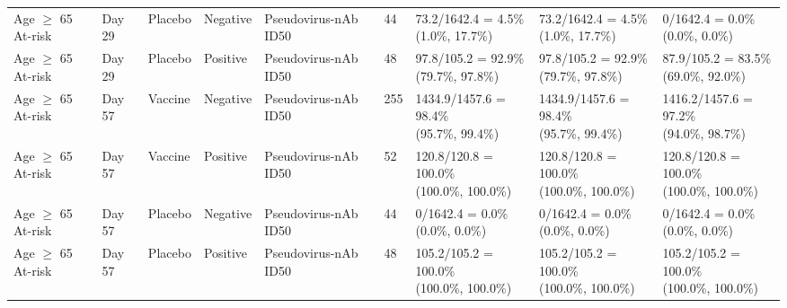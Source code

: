 \documentclass[]{book}
\theoremstyle{definition}
\theoremstyle{definition}
\theoremstyle{definition}
\newcommand{\1}{\mathbbm{1}}
\begin{document}
\begin{landscape}
\begin{ThreePartTable}
\begin{longtable}[t]{>{\raggedright\arraybackslash}p{2.7cm}llllllll}
\hspace{1em}Age $\geq$ 65 At-risk & Day 29 & Placebo & Negative & Pseudovirus-nAb ID50 & 44 & \makecell[l]{73.2/1642.4 = 4.5\%\\(1.0\%, 17.7\%)} & \makecell[l]{73.2/1642.4 = 4.5\%\\(1.0\%, 17.7\%)} & \makecell[l]{0/1642.4 = 0.0\%\\(0.0\%, 0.0\%)}\\
\hspace{1em}Age $\geq$ 65 At-risk & Day 29 & Placebo & Positive & Pseudovirus-nAb ID50 & 48 & \makecell[l]{97.8/105.2 = 92.9\%\\(79.7\%, 97.8\%)} & \makecell[l]{97.8/105.2 = 92.9\%\\(79.7\%, 97.8\%)} & \makecell[l]{87.9/105.2 = 83.5\%\\(69.0\%, 92.0\%)}\\
\hspace{1em}Age $\geq$ 65 At-risk & Day 57 & Vaccine & Negative & Pseudovirus-nAb ID50 & 255 & \makecell[l]{1434.9/1457.6 = 98.4\%\\(95.7\%, 99.4\%)} & \makecell[l]{1434.9/1457.6 = 98.4\%\\(95.7\%, 99.4\%)} & \makecell[l]{1416.2/1457.6 = 97.2\%\\(94.0\%, 98.7\%)}\\
\hspace{1em}Age $\geq$ 65 At-risk & Day 57 & Vaccine & Positive & Pseudovirus-nAb ID50 & 52 & \makecell[l]{120.8/120.8 = 100.0\%\\(100.0\%, 100.0\%)} & \makecell[l]{120.8/120.8 = 100.0\%\\(100.0\%, 100.0\%)} & \makecell[l]{120.8/120.8 = 100.0\%\\(100.0\%, 100.0\%)}\\
\hspace{1em}Age $\geq$ 65 At-risk & Day 57 & Placebo & Negative & Pseudovirus-nAb ID50 & 44 & \makecell[l]{0/1642.4 = 0.0\%\\(0.0\%, 0.0\%)} & \makecell[l]{0/1642.4 = 0.0\%\\(0.0\%, 0.0\%)} & \makecell[l]{0/1642.4 = 0.0\%\\(0.0\%, 0.0\%)}\\
\hspace{1em}Age $\geq$ 65 At-risk & Day 57 & Placebo & Positive & Pseudovirus-nAb ID50 & 48 & \makecell[l]{105.2/105.2 = 100.0\%\\(100.0\%, 100.0\%)} & \makecell[l]{105.2/105.2 = 100.0\%\\(100.0\%, 100.0\%)} & \makecell[l]{105.2/105.2 = 100.0\%\\(100.0\%, 100.0\%)}\\

\end{longtable}
\end{ThreePartTable}
\end{landscape}
\end{document}
